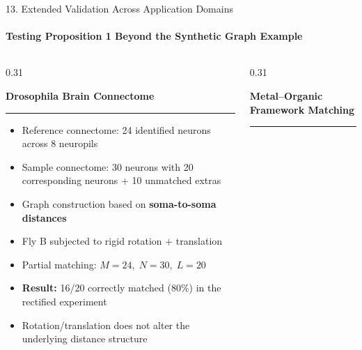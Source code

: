 \documentclass[aspectratio=169, 11pt]{beamer}
\begin{document}
\begin{frame}{13. Extended Validation Across Application Domains}
\framesubtitle{Testing Proposition 1 Beyond the Synthetic Graph Example}

\begin{columns}[T]


\begin{column}{0.31\textwidth}

\textbf{Drosophila Brain Connectome}
\vspace{0.2em}
\hrule
\vspace{0.3em}

\small
\begin{itemize}
\setlength\itemsep{0.35em}

\item Reference connectome:
24 identified neurons across 8 neuropils

\item Sample connectome:
30 neurons with 20 corresponding neurons + 10 unmatched extras

\item Graph construction based on
\textbf{soma-to-soma distances}

\item Fly B subjected to
rigid rotation + translation

\item Partial matching:
$M=24,\;N=30,\;L=20$

\item \textbf{Result:}
16/20 correctly matched
(80\%) in the rectified experiment

\item Rotation/translation does not alter
the underlying distance structure

\end{itemize}

\end{column}



\begin{column}{0.31\textwidth}

\textbf{Metal--Organic Framework Matching}
\vspace{0.2em}
\hrule
\vspace{0.3em}


\end{column}
\end{columns}
\end{frame}
\end{document}
